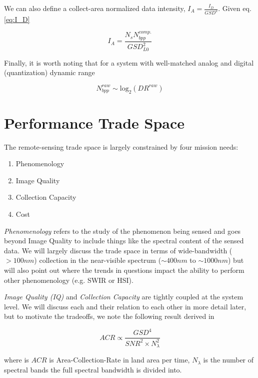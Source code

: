 \documentclass[10pt,journal]{IEEEtran}  %
\begin{document}
We can also define a collect-area normalized data intensity, $I_A = \frac{I_{D}}{GSD^2}$.  Given eq. \ref{eq:I_D}

\begin{equation}
    I_A = \frac{N_s N_{bpp}^{comp.}}{GSD_{L0}^2}
\end{equation}

Finally, it is worth noting that for a system with well-matched analog and digital (quantization) dynamic range

\begin{equation}
    N_{bpp}^{raw} \sim \textrm{log}_2(DR^{raw})
\end{equation}

\section{Performance Trade Space}
\label{sec:trade_space}

The remote-sensing trade space is largely constrained by four mission needs:

\begin{enumerate}
\item Phenomenology
\item Image Quality
\item Collection Capacity
\item Cost
\end{enumerate}

\emph{Phenomenology} refers to the study of the phenomenon being sensed and goes beyond Image Quality to include things like the spectral content of the sensed data.  We will largely discuss the trade space in terms of wide-bandwidth ($>100nm$) collection in the near-visible spectrum ($\sim 400nm$ to $\sim 1000nm$) but will also point out where the trends in questions impact the ability to perform other phenomenology (e.g. SWIR or HSI).

\emph{Image Quality (IQ)} and \emph{Collection Capacity} are tightly coupled at the system level.  We will discuss each and their relation to each other in more detail later, but to motivate the tradeoffs, we note the following result derived in \cite{shaw}

\begin{equation}
    \label{eq:acr_scaling}
    ACR \propto \frac{GSD^4}{SNR^2 \times N_{\lambda}^2}
\end{equation}

where is $ACR$ is Area-Collection-Rate in land area per time, $N_{\lambda}$ is the number of spectral bands the full spectral bandwidth is divided into.  
\end{document}
